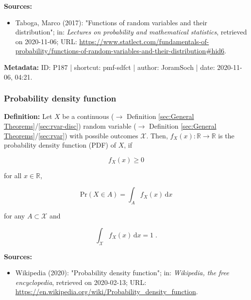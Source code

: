 \documentclass[a4paper,12pt,twoside]{book}
\begin{document}
\vspace{1em}
\textbf{Sources:}
\begin{itemize}
\item Taboga, Marco (2017): "Functions of random variables and their distribution"; in: \textit{Lectures on probability and mathematical statistics}, retrieved on 2020-11-06; URL: \url{https://www.statlect.com/fundamentals-of-probability/functions-of-random-variables-and-their-distribution#hid6}.
\end{itemize}


\vspace{1em}
\textbf{Metadata:} ID: P187 | shortcut: pmf-sdfct | author: JoramSoch | date: 2020-11-06, 04:21.
\vspace{1em}



\subsubsection[\textit{Probability density function}]{Probability density function} \label{sec:pdf}
\setcounter{equation}{0}

\textbf{Definition:} Let $X$ be a continuous ($\rightarrow$ Definition \ref{sec:General Theorems}/\ref{sec:rvar-disc}) random variable ($\rightarrow$ Definition \ref{sec:General Theorems}/\ref{sec:rvar}) with possible outcomes $\mathcal{X}$. Then, $f_X(x): \mathbb{R} \to \mathbb{R}$ is the probability density function (PDF) of $X$, if

\begin{equation} \label{eq:pdf-pdf-def-s0}
f_X(x) \geq 0
\end{equation}

for all $x \in \mathbb{R}$,

\begin{equation} \label{eq:pdf-pdf-def-s1}
\mathrm{Pr}(X \in A) = \int_{A} f_X(x) \, \mathrm{d}x
\end{equation}

for any $A \subset \mathcal{X}$ and

\begin{equation} \label{eq:pdf-pdf-def-s2}
\int_{\mathcal{X}} f_X(x) \, \mathrm{d}x = 1 \; .
\end{equation}


\vspace{1em}
\textbf{Sources:}
\begin{itemize}
\item Wikipedia (2020): "Probability density function"; in: \textit{Wikipedia, the free encyclopedia}, retrieved on 2020-02-13; URL: \url{https://en.wikipedia.org/wiki/Probability_density_function}.
\end{itemize}
\end{document}
